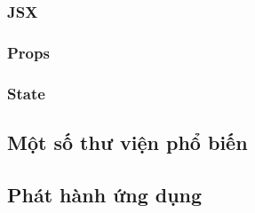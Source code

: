 \subsubsection{JSX}
\subsubsection{Props}
\subsubsection{State}

\subsection{Một số thư viện phổ biến}

\subsection{Phát hành ứng dụng}
